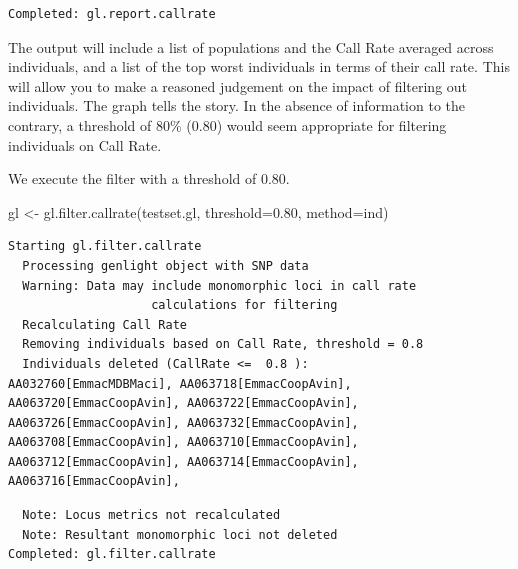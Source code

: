 \documentclass[
  letterpaper,
  DIV=11,
  numbers=noendperiod]{scrreprt}
\newenvironment{Shaded}{\begin{snugshade}}{\end{snugshade}}
\newcommand{\AttributeTok}[1]{\textcolor[rgb]{0.49,0.56,0.16}{#1}}
\newcommand{\FloatTok}[1]{\textcolor[rgb]{0.25,0.63,0.44}{#1}}
\newcommand{\FunctionTok}[1]{\textcolor[rgb]{0.02,0.16,0.49}{#1}}
\newcommand{\NormalTok}[1]{\textcolor[rgb]{0.00,0.44,0.13}{#1}}
\newcommand{\OtherTok}[1]{\textcolor[rgb]{0.00,0.44,0.13}{#1}}
\newcommand{\StringTok}[1]{\textcolor[rgb]{0.25,0.44,0.63}{#1}}
\let\textttOrig\texttt
\renewcommand{\texttt}[1]{\textttOrig{\color{blue}{#1}}}
\begin{document}
\begin{verbatim}
Completed: gl.report.callrate 
\end{verbatim}

The output will include a list of populations and the Call Rate averaged
across individuals, and a list of the top worst individuals in terms of
their call rate. This will allow you to make a reasoned judgement on the
impact of filtering out individuals. The graph tells the story. In the
absence of information to the contrary, a threshold of 80\% (0.80) would
seem appropriate for filtering individuals on Call Rate.

We execute the filter with a threshold of 0.80.

\begin{Shaded}
\begin{Highlighting}[]
\NormalTok{gl }\OtherTok{\textless{}{-}} \FunctionTok{gl.filter.callrate}\NormalTok{(testset.gl, }\AttributeTok{threshold=}\FloatTok{0.80}\NormalTok{, }\AttributeTok{method=}\StringTok{\textquotesingle{}ind\textquotesingle{}}\NormalTok{)}
\end{Highlighting}
\end{Shaded}

\begin{verbatim}
Starting gl.filter.callrate 
  Processing genlight object with SNP data
  Warning: Data may include monomorphic loci in call rate 
                    calculations for filtering
  Recalculating Call Rate
  Removing individuals based on Call Rate, threshold = 0.8 
  Individuals deleted (CallRate <=  0.8 ):
AA032760[EmmacMDBMaci], AA063718[EmmacCoopAvin], AA063720[EmmacCoopAvin], AA063722[EmmacCoopAvin], AA063726[EmmacCoopAvin], AA063732[EmmacCoopAvin], AA063708[EmmacCoopAvin], AA063710[EmmacCoopAvin], AA063712[EmmacCoopAvin], AA063714[EmmacCoopAvin], AA063716[EmmacCoopAvin],
\end{verbatim}

\begin{figure}[H]

{\centering \texttt{[image: basicfiltering\_files/figure-pdf/unnamed-chunk-7-1.pdf]}

}

\end{figure}

\begin{verbatim}
  Note: Locus metrics not recalculated
  Note: Resultant monomorphic loci not deleted
Completed: gl.filter.callrate 
\end{verbatim}
\end{document}
